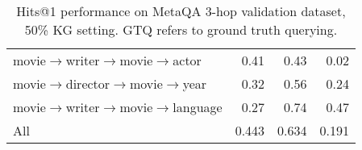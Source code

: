 \documentclass[11pt]{article}
\renewcommand\:{\colon} \newcommand{\sset}[1]{\left\{\,#1\,\right\}} \newcommand{\ssets}[1]{\left\{#1\right\}} \newcommand{\ssetn}[1]{\{\,#1\,\}}
\begin{document}
\begin{table*}[ht!]
\begin{tabular}{@{}lrrr@{}}
movie$\rightarrow$writer$\rightarrow$movie$\rightarrow$actor      & 0.41 & 0.43 & \cellcolor[HTML]{FBFDFC}0.02  \\
movie$\rightarrow$director$\rightarrow$movie$\rightarrow$year     & 0.32 & 0.56 & \cellcolor[HTML]{C4E7D6}0.24  \\
movie$\rightarrow$writer$\rightarrow$movie$\rightarrow$language   & 0.27 & 0.74 & \cellcolor[HTML]{8BD0AF}0.47  \\ \midrule
All                                          & 0.443 & 0.634 & 0.191                          \\ \bottomrule
\end{tabular}\caption{Hits@1 performance on MetaQA 3-hop validation dataset, 50\% KG setting. GTQ refers to ground truth querying.}
\label{tab:metaqa_analysis_3hop}
\end{table*} 
\end{document}
